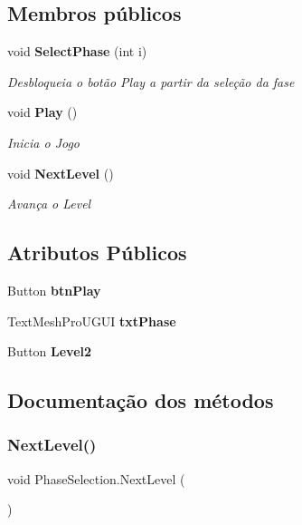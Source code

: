 \subsection*{Membros públicos}
\begin{DoxyCompactItemize}
\item 
void \textbf{ Select\+Phase} (int i)
\begin{DoxyCompactList}\small\item\em Desbloqueia o botão Play a partir da seleção da fase \end{DoxyCompactList}\item 
void \textbf{ Play} ()
\begin{DoxyCompactList}\small\item\em Inicia o Jogo \end{DoxyCompactList}\item 
void \textbf{ Next\+Level} ()
\begin{DoxyCompactList}\small\item\em Avança o Level \end{DoxyCompactList}\end{DoxyCompactItemize}
\subsection*{Atributos Públicos}
\begin{DoxyCompactItemize}
\item 
Button \textbf{ btn\+Play}
\item 
Text\+Mesh\+Pro\+U\+G\+UI \textbf{ txt\+Phase}
\item 
Button \textbf{ Level2}
\end{DoxyCompactItemize}


\subsection{Documentação dos métodos}
\mbox{\label{class_phase_selection_a40a79cf0cebfb99312810d6ba9d5fd9b}} 
\subsubsection{NextLevel()}
{\footnotesize\ttfamily void Phase\+Selection.\+Next\+Level (\begin{DoxyParamCaption}{ }\end{DoxyParamCaption})}



